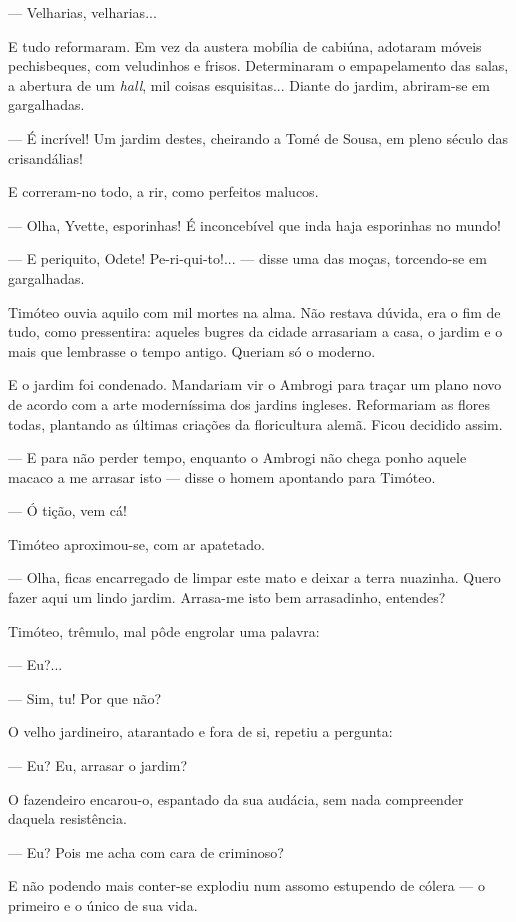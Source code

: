 --- Velharias, velharias...

E tudo reformaram. Em vez da austera mobília de cabiúna, adotaram móveis
pechisbeques, com veludinhos e frisos. Determinaram o empapelamento das
salas, a abertura de um \emph{hall}, mil coisas esquisitas... Diante do
jardim, abriram-se em gargalhadas.

--- É incrível! Um jardim destes, cheirando a Tomé de Sousa, em pleno
século das crisandálias!

E correram-no todo, a rir, como perfeitos malucos.

--- Olha, Yvette, esporinhas! É inconcebível que inda haja esporinhas no
mundo!

--- E periquito, Odete! Pe-ri-qui-to!... --- disse uma das moças,
torcendo-se em gargalhadas.

Timóteo ouvia aquilo com mil mortes na alma. Não restava dúvida, era o
fim de tudo, como pressentira: aqueles bugres da cidade arrasariam a
casa, o jardim e o mais que lembrasse o tempo antigo. Queriam só o
moderno.

E o jardim foi condenado. Mandariam vir o Ambrogi para traçar um plano
novo de acordo com a arte moderníssima dos jardins ingleses. Reformariam
as flores todas, plantando as últimas criações da floricultura alemã.
Ficou decidido assim.

--- E para não perder tempo, enquanto o Ambrogi não chega ponho aquele
macaco a me arrasar isto --- disse o homem apontando para Timóteo.

--- Ó tição, vem cá!

Timóteo aproximou-se, com ar apatetado.

--- Olha, ficas encarregado de limpar este mato e deixar a terra
nuazinha. Quero fazer aqui um lindo jardim. Arrasa-me isto bem
arrasadinho, entendes?

Timóteo, trêmulo, mal pôde engrolar uma palavra:

--- Eu?...

--- Sim, tu! Por que não?

O velho jardineiro, atarantado e fora de si, repetiu a pergunta:

--- Eu? Eu, arrasar o jardim?

O fazendeiro encarou-o, espantado da sua audácia, sem nada compreender
daquela resistência.

--- Eu? Pois me acha com cara de criminoso?

E não podendo mais conter-se explodiu num assomo estupendo de cólera ---
o primeiro e o único de sua vida.

